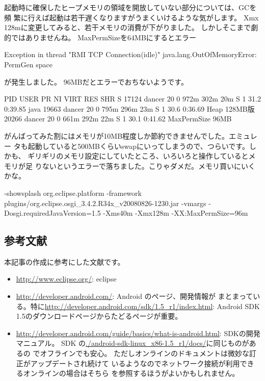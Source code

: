 \documentclass[mingoth,a4paper]{jsarticle}
\begin{document}
\begin{commandline}
起動時に確保したヒープメモリの領域を開放していない部分については、GCを頻
繁に行えば起動は若干遅くなりますがうまくいけるような気がします。
Xmx 128mに変更してみると、若干メモリの消費が下がりました。
しかしそこまで劇的ではありませんね。
MaxPermSizeを64MBにするとエラー
\begin{commandline}
 Exception in thread "RMI TCP Connection(idle)" java.lang.OutOfMemoryError: PermGen space
\end{commandline}
が発生しました。
96MBだとエラーでおちないようです。

\begin{commandline}
  PID USER      PR  NI  VIRT  RES  SHR S %
17124 dancer    20   0  972m 302m  20m S    1 31.2   0:39.85 java
19663 dancer    20   0  795m 296m  23m S    1 30.6   0:36.69 Heap 128MB版
20266 dancer    20   0  661m 292m  22m S    1 30.1   0:41.62 MaxPermSize 96MB               
\end{commandline}

がんばってみた割にはメモリが10MB程度しか節約できませんでした。エミュレー
タも起動していると500MBくらいswapにいってしまうので、つらいです。しかも、
ギリギリのメモリ設定にしていたところ、いろいろと操作しているとメモリが足
りないというエラーで落ちました。こりゃダメだ。メモリ買いにいくかな。

\begin{commandline}
-showsplash
org.eclipse.platform
-framework
plugins/org.eclipse.osgi_3.4.2.R34x_v20080826-1230.jar
-vmargs
-Dosgi.requiredJavaVersion=1.5
-Xms40m
-Xmx128m
-XX:MaxPermSize=96m
\end{commandline}

\subsection{参考文献}

本記事の作成に参考にした文献です。

\begin{itemize}
 \item \url{http://www.eclipse.org/}: eclipse
 \item \url{http://developer.android.com/}: Android のページ、開発情報が
       まとまっている。特に\url{http://developer.android.com/sdk/1.5_r1/index.html}: Android
       SDK 1.5のダウンロードページからたどるページが重要。
 \item
      \url{http://developer.android.com/guide/basics/what-is-android.html}: 
      SDKの開発マニュアル。
      SDK の\url{./android-sdk-linux_x86-1.5_r1/docs/}に同じものがあるの
      でオフラインでも安心。
      ただしオンラインのドキュメントは微妙な訂正がアップデートされ続けて
      いるようなのでネットワーク接続が利用できるオンラインの場合はそちら
      を参照するほうがよいかもしれません。
\end{itemize}


\end{commandline}
\end{document}
